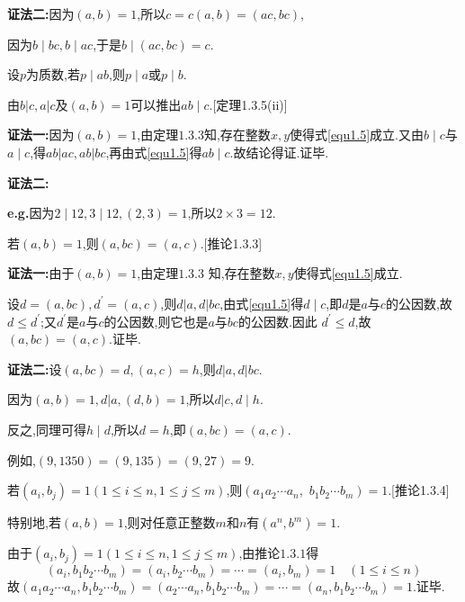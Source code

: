 \textbf{证法二:}因为$(a,b)=1$,所以$c=c(a,b)=(ac,bc)$,

因为$b\mid bc,b\mid ac$,于是$b\mid(ac,bc)=c$.

\corollary 设$p$为质数,若$p \mid a b$,则$p \mid a$或$p \mid b$.

\theorem 由$b|c, a| c$及$(a, b)=1$可以推出$a b \mid c$.{\color{red}[定理1.3.5(ii)]}

\proof \textbf{证法一:}因为$(a, b)=1$,由定理$1.3.3$知,存在整数$x, y$使得式\eqref{equ1.5}成立.又由$b \mid c$与$a \mid c$,得$a b|a c, a b| b c$,再由式\eqref{equ1.5}得$a b \mid c$.故结论得证.证毕.

\textbf{证法二:}

\textbf{e.g.}因为$2\mid 12,3\mid 12,(2,3)=1$,所以$2\times 3=12$.

\corollary 若$(a, b)=1$,则$(a, b c)=(a, c)$.{\color{red}[推论1.3.3]}

\proof \textbf{证法一:}由于$(a, b)=1$,由定理$1.3.3$ 知,存在整数$x, y$使得式\eqref{equ1.5}成立. 

设$d=(a, b c), d^{\prime}=(a, c)$,则$d|a, d| b c$,由式\eqref{equ1.5}得$d \mid c$,即$d$是$a$与$c$的公因数,故$d\leqslant d^{\prime}$;又$d^{\prime}$是$a$与$c$的公因数,则它也是$a$与$b c$的公因数.因此 $d^{\prime} \leqslant d$,故$(a, b c)=(a, c)$.证毕.

\textbf{证法二:}设$(a, b c)=d,(a, c)=h$,则$d|a, d| b c$.

因为$(a, b)=1, d|a,(d, b)=1$,所以$d| c, d \mid h$.

反之,同理可得$h \mid d$,所以$d=h$,即$(a, b c)=(a, c)$.

例如,$(9,1350)=(9,135)=(9,27)=9$.

\corollary 若$\left(a_{i}, b_{j}\right)=1(1 \leqslant i \leqslant n, 1 \leqslant j \leqslant m)$,则$\left(a_{1} a_{2} \cdots a_{n},\right.$ $\left.b_{1} b_{2} \cdots b_{m}\right)=1$.{\color{red}[推论1.3.4]}

特别地,若$(a, b)=1$,则对任意正整数$m$和$n$有$\left(a^{n}, b^{m}\right)=1$.

\proof 由于$\left(a_{i}, b_{j}\right)=1(1 \leqslant i \leqslant n, 1 \leqslant j \leqslant m)$,由推论$1.3.1$得
\begin{equation*}
	\left(a_{i}, b_{1} b_{2} \cdots b_{m}\right)=\left(a_{i}, b_{2} \cdots b_{m}\right)=\cdots=\left(a_{i}, b_{m}\right)=1 \quad(1 \leqslant i \leqslant n)
\end{equation*}
故$\left(a_{1} a_{2} \cdots a_{n}, b_{1} b_{2} \cdots b_{m}\right)=\left(a_{2} \cdots a_{n}, b_{1} b_{2} \cdots b_{m}\right)=\cdots=\left(a_{n}, b_{1} b_{2} \cdots b_{m}\right)=1$.证毕.


